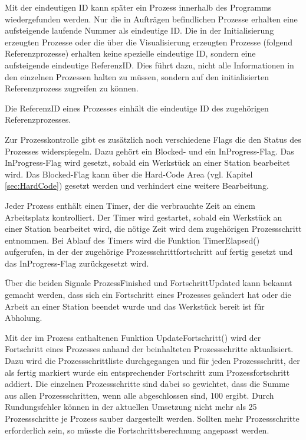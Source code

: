 Mit der eindeutigen ID kann später ein Prozess innerhalb des Programms wiedergefunden werden. Nur die in Aufträgen befindlichen Prozesse erhalten eine aufsteigende laufende Nummer als eindeutige ID. Die in der Initialisierung erzeugten Prozesse oder die über die Visualisierung erzeugten Prozesse (folgend Referenzprozesse) erhalten keine spezielle eindeutige ID, sondern eine aufsteigende eindeutige ReferenzID. Dies führt dazu, nicht alle Informationen in den einzelnen Prozessen halten zu müssen, sondern auf den initialisierten Referenzprozess zugreifen zu können. 

Die ReferenzID eines Prozesses einhält die eindeutige ID des zugehörigen Referenzprozesses. 

Zur Prozesskontrolle gibt es zusätzlich noch verschiedene Flags die den Status des Prozesses widerspiegeln. Dazu gehört ein Blocked- und ein InProgress-Flag. Das InProgress-Flag wird gesetzt, sobald ein Werkstück an einer Station bearbeitet wird. Das Blocked-Flag kann über die Hard-Code Area (vgl. Kapitel \ref{sec:HardCode}) gesetzt werden und verhindert eine weitere Bearbeitung. 

Jeder Prozess enthält einen Timer, der die verbrauchte Zeit an einem Arbeitsplatz kontrolliert. Der Timer wird gestartet, sobald ein Werkstück an einer Station bearbeitet wird, die nötige Zeit wird dem zugehörigen Prozessschritt entnommen. Bei Ablauf des Timers wird die Funktion TimerElapsed() aufgerufen, in der der zugehörige Prozessschrittfortschritt auf fertig gesetzt und das InProgress-Flag zurückgesetzt wird. 

Über die beiden Signale ProzessFinished und FortschrittUpdated kann bekannt gemacht werden, dass sich ein Fortschritt eines Prozesses geändert hat oder die Arbeit an einer Station beendet wurde und das Werkstück bereit ist für Abholung.

Mit der im Prozess enthaltenen Funktion UpdateFortschritt() wird der Fortschritt eines Prozesses anhand der beinhalteten Prozessschritte aktualisiert. Dazu wird die Prozessschrittliste durchgegangen und für jeden Prozessschritt, der als fertig markiert wurde ein entsprechender Fortschritt zum Prozessfortschritt addiert. Die einzelnen Prozessschritte sind dabei so gewichtet, dass die Summe aus allen Prozessschritten, wenn alle abgeschlossen sind, 100 ergibt. Durch Rundungsfehler können in der aktuellen Umsetzung nicht mehr als 25 Prozessschritte je Prozess sauber dargestellt werden. Sollten mehr Prozessschritte erforderlich sein, so müsste die Fortschrittsberechnung angepasst werden.

